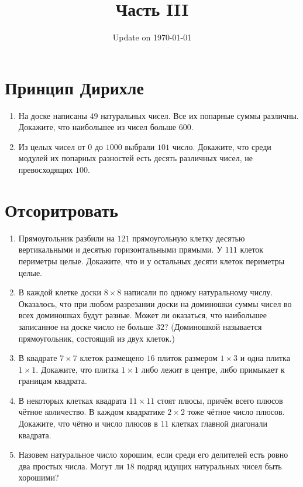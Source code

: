 \documentclass[fleqn,oneside]{book}
\begin{document}
\fontsize{12}{12}\selectfont

\title{\bf \huge Часть III}
\date{Update on \today}
\maketitle 

\chapter*{Принцип Дирихле}

\begin{enumerate}
\item На доске написаны $49$ натуральных чисел. Все их попарные суммы различны. Докажите, что наибольшее из чисел больше $600$.
\item Из целых чисел от $0$ до $1000$ выбрали $101$ число. Докажите, что среди модулей их попарных разностей есть десять различных чисел, не превосходящих $100$.
\end{enumerate}



\chapter*{Отсоритровать}

\begin{enumerate}
\item Прямоугольник разбили на $121$ прямоугольную клетку десятью вертикальными и десятью горизонтальными прямыми. У $111$ клеток периметры целые. Докажите, что и у остальных десяти клеток периметры целые.
\item В каждой клетке доски $8 \times 8$ написали по одному натуральному числу. Оказалось, что
при любом разрезании доски на доминошки суммы чисел во всех доминошках будут
разные. Может ли оказаться, что наибольшее записанное на доске число не больше $32$?
(Доминошкой называется прямоугольник, состоящий из двух клеток.)
\item В квадрате $7 \times 7$ клеток размещено $16$ плиток размером $1 \times 3$ и одна плитка $1 \times 1$. Докажите, что плитка $1 \times 1$ либо лежит в центре, либо примыкает к границам квадрата. 
\item В некоторых клетках квадрата $11 \times 11$ стоят плюсы, причём всего плюсов чётное количество. В каждом квадратике $2 \times 2$ тоже чётное число плюсов. Докажите, что чётно и число плюсов в $11$ клетках главной диагонали квадрата.
\item Назовем натуральное число хорошим, если среди его делителей есть ровно два простых числа.
Могут ли $18$ подряд идущих натуральных чисел быть хорошими?
\end{enumerate}
\end{document}
